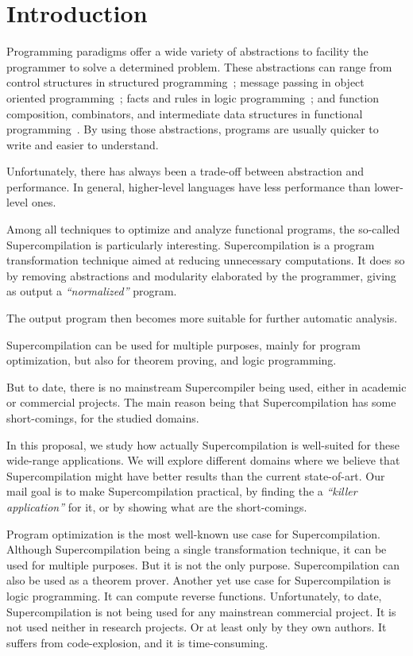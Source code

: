 
\section{Introduction}

Programming paradigms offer a wide variety of abstractions to facility the programmer to solve a determined problem.
These abstractions can range from control structures in structured programming~\cite{Dijkstra:1972:CIN:1243380.1243381};
message passing in object oriented programming~\cite{329756};
facts and rules in logic programming~\cite{Sterling:1986:APA:6686}; and
function composition, combinators, and intermediate data structures in functional programming~\cite{Hughes:1989:WFP:63410.63411}.
By using those abstractions, programs are usually quicker to write and easier to understand.

Unfortunately, there has always been a trade-off between abstraction and performance.
In general, higher-level languages have less performance than lower-level ones.

Among all techniques to optimize and analyze functional programs, the so-called Supercompilation is particularly interesting.
Supercompilation is a program transformation technique aimed at reducing unnecessary computations.
It does so by removing abstractions and modularity elaborated by the programmer, giving as output a \emph{``normalized''} program.

The output program then becomes more suitable for further automatic analysis.

Supercompilation can be used for multiple purposes, mainly for program optimization, but also for theorem proving, and logic programming.

But to date, there is no mainstream Supercompiler being used, either in academic or commercial projects.
The main reason being that Supercompilation has some short-comings, for the studied domains.

In this proposal, we study how actually Supercompilation is well-suited for these wide-range applications.
We will explore different domains where we believe that Supercompilation might have better results than the current state-of-art.
Our mail goal is to make Supercompilation practical, by finding the a \emph{``killer application''} for it, or by showing what are the short-comings.

Program optimization is the most well-known use case for Supercompilation.
Although Supercompilation being a single transformation technique, it can be used for multiple purposes.
But it is not the only purpose.
Supercompilation can also be used as a theorem prover.
Another yet use case for Supercompilation is logic programming.
It can compute reverse functions.
Unfortunately, to date, Supercompilation is not being used for any mainstrean commercial project.
It is not used neither in research projects. Or at least only by they own authors.
It suffers from code-explosion, and it is time-consuming.


